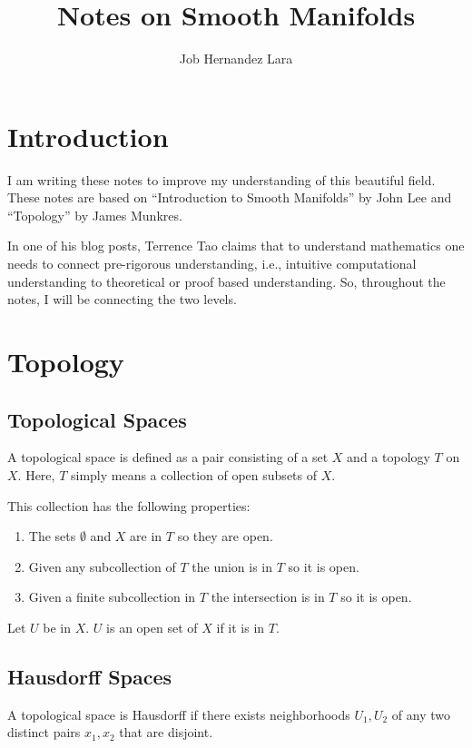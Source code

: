 \documentclass{article}
\title{Notes on Smooth Manifolds}
\author{Job Hernandez Lara}
\date{}
\begin{document}
\maketitle

\section{Introduction}
I am writing these notes to improve my understanding of this beautiful field.
These notes are based on ``Introduction to Smooth Manifolds'' by John Lee and ``Topology'' by James Munkres.

In one of his blog posts, Terrence Tao claims that to understand mathematics one needs to connect pre-rigorous understanding, i.e., intuitive computational understanding to theoretical or proof based understanding. So, throughout the notes, I will be connecting the two levels.

\section{Topology}

\subsection{Topological Spaces}

A topological space is defined as a pair consisting of a set $ X $ and a topology $ T $ on $ X $. Here, $ T $ simply means a collection of open subsets of $ X $.

This collection has the following properties:

\begin{enumerate}
\item The sets $ \emptyset $ and $ X $ are in $ T $ so they are open.
\item Given any subcollection of $ T $ the union is in $ T $ so it is open.
\item Given a finite subcollection in $ T $ the intersection is in $ T $ so it is open.
\end{enumerate}

Let $ U $ be in $ X $. $ U $ is an open set of $ X $ if it is in $ T $.
\subsection{Hausdorff Spaces}
A topological space is Hausdorff if there exists neighborhoods $ U_{1}, U_{2} $ of any two distinct pairs $ x_{1}, x_{2} $ that are disjoint.
\end{document}
